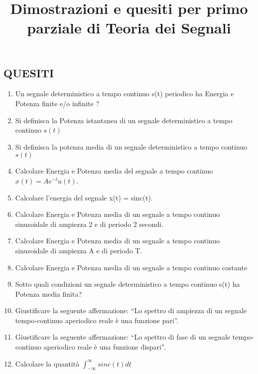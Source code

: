 \documentclass[12pt
]{article}
\title{Dimostrazioni e quesiti per primo parziale di Teoria dei Segnali}
\author{}
\date{}
\begin{document}
	\maketitle

\hypertarget{quesiti}{%
\subsection{QUESITI}\label{quesiti}}

\begin{enumerate}
\def\labelenumi{\arabic{enumi}.}

\item
	Un segnale deterministico a tempo continuo s(t) periodico ha Energia e Potenza finite e/o infinite ?
	
\item
Si definisca la Potenza istantanea di un segnale deterministico a
tempo continuo $s(t)$

\item 
Si definisca la potenza media di un segnale deterministico a tempo continuo $s(t)$

\item
Calcolare Energia e Potenza media del segnale a tempo continuo
\(x(t) = Ae ^{-t} u(t)\).

\item
Calcolare l'energia del segnale x(t) = sinc(t).

\item
Calcolare Energia e Potenza media di un segnale a tempo continuo
sinusoidale di ampiezza 2 e di periodo 2 secondi.
\item
Calcolare Energia e Potenza media di un segnale a tempo continuo
sinusoidale di ampiezza A e di periodo T.

\item
Calcolare Energia e Potenza media di un segnale a tempo continuo
costante

\item 
Sotto quali condizioni un segnale deterministico a tempo continuo s(t) ha Potenza media finita?

\item
Giustificare la seguente affermazione: ``Lo spettro di ampiezza di un
segnale tempo-continuo aperiodico reale è una funzione pari''.

\item
Giustificare la seguente affermazione: ``Lo spettro di fase di un
	segnale tempo-continuo aperiodico reale è una funzione dispari''.


\item
Calcolare la quantità
\(\displaystyle \int_{- \infty}^{\infty} sinc(t) dt\)
	

\end{enumerate}
\end{document}
